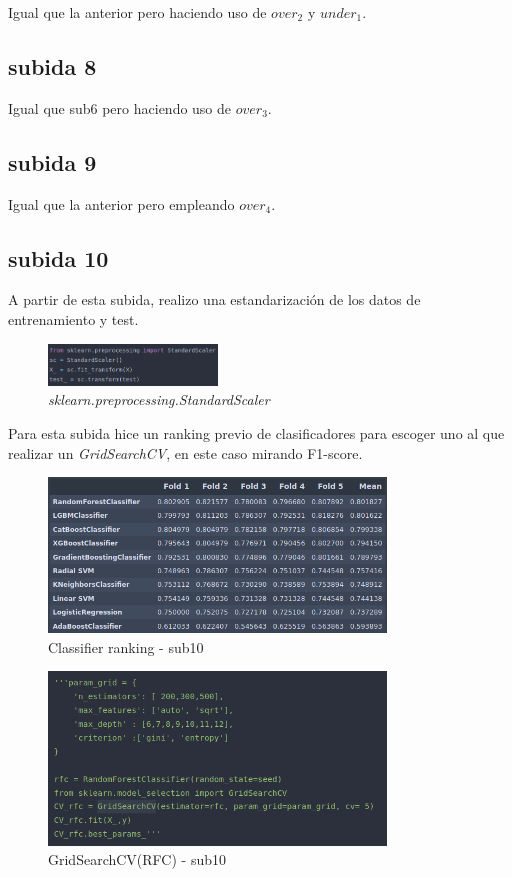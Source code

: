 Igual que la anterior pero haciendo uso de $over_{2}$ y $under_{1}$.

\subsection{subida 8}

Igual que sub6 pero haciendo uso de $over_{3}$.

\subsection{subida 9}

Igual que la anterior pero empleando $over_{4}$.

\subsection{subida 10}

A partir de esta subida, realizo una estandarización de los datos de entrenamiento y test.

\begin{figure}[H]
\centering
\includegraphics[width=0.4\textwidth]{imagenes/sub10-norm.png}
\caption{\textit{sklearn.preprocessing.StandardScaler}}
\end{figure}

Para esta subida hice un ranking previo de clasificadores para escoger uno al que realizar un \textit{GridSearchCV}, en este caso mirando F1-score.

\begin{figure}[H]
\centering
\includegraphics[width=0.8\textwidth]{imagenes/sub10-rank.png}
\caption{Classifier ranking - sub10}
\end{figure}

\begin{figure}[H]
\centering
\includegraphics[width=0.8\textwidth]{imagenes/sub10-grid.png}
\caption{GridSearchCV(RFC) - sub10}
\end{figure}


